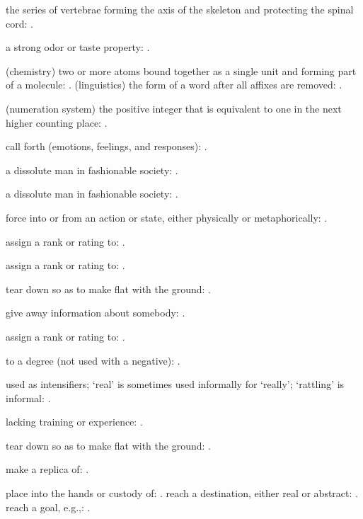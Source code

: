   the series of vertebrae forming the axis of the skeleton and protecting the spinal cord: .

  a strong odor or taste property: .

  (chemistry) two or more atoms bound together as a single unit and forming part of a molecule: . (linguistics) the form of a word after all affixes are removed: .

  (numeration system) the positive integer that is equivalent to one in the next higher counting place: .

  call forth (emotions, feelings, and responses): .

  a dissolute man in fashionable society: .

  a dissolute man in fashionable society: .

  force into or from an action or state, either physically or metaphorically: .

  assign a rank or rating to: .

  assign a rank or rating to: .

  tear down so as to make flat with the ground: .

  give away information about somebody: .

  assign a rank or rating to: .

  to a degree (not used with a negative): .

  used as intensifiers; `real' is sometimes used informally for `really'; `rattling' is informal: .

  lacking training or experience: .

  tear down so as to make flat with the ground: .

  make a replica of: .

  place into the hands or custody of: . reach a destination, either real or abstract: . reach a goal, e.g.,: .


